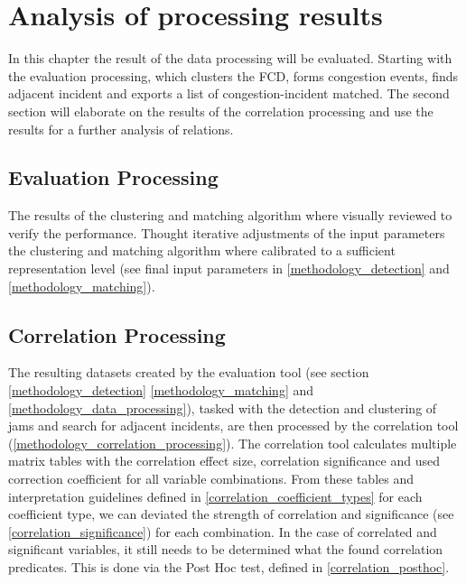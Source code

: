 \chapter{Analysis of processing results}
\label{analysis_processing}
In this chapter the result of the data processing will be evaluated. Starting with the evaluation processing, which clusters the FCD, forms congestion events, finds adjacent incident and exports a list of congestion-incident matched. The second section will elaborate on the results of the correlation processing and use the results for a further analysis of relations.

\section{Evaluation Processing}
The results of the clustering and matching algorithm where visually reviewed to verify the performance. Thought iterative adjustments of the input parameters the clustering and matching algorithm where calibrated to a sufficient representation level (see final input parameters in \autoref{methodology_detection} and \autoref{methodology_matching}).


\section{Correlation Processing}
\label{analysis_processing_evaluation}
The resulting datasets created by the evaluation tool (see section \autoref{methodology_detection} \autoref{methodology_matching} and \autoref{methodology_data_processing}), tasked with the detection and clustering of jams and search for adjacent incidents, are then processed by the correlation tool (\autoref{methodology_correlation_processing}). The correlation tool calculates multiple matrix tables with the correlation effect size, correlation significance and used correction coefficient for all variable combinations. From these tables and interpretation guidelines defined in \autoref{correlation_coefficient_types} for each coefficient type, we can deviated the strength of correlation and significance (see \autoref{correlation_significance}) for each combination. In the case of correlated and significant variables, it still needs to be determined what the found correlation predicates. This is done via the Post Hoc test, defined in \autoref{correlation_posthoc}.

